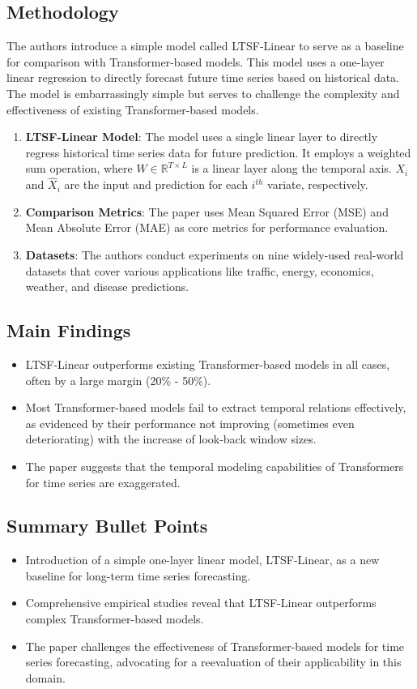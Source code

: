 \documentclass{article}
\begin{document}
\subsection{Methodology}
The authors introduce a simple model called LTSF-Linear to serve as a baseline for comparison with Transformer-based models. This model uses a one-layer linear regression to directly forecast future time series based on historical data. The model is embarrassingly simple but serves to challenge the complexity and effectiveness of existing Transformer-based models.

\begin{enumerate}
    \item \textbf{LTSF-Linear Model}: The model uses a single linear layer to directly regress historical time series data for future prediction. It employs a weighted sum operation, where \( W \in \mathbb{R}^{T \times L} \) is a linear layer along the temporal axis. \( X_i \) and \( \hat{X}_i \) are the input and prediction for each \( i^{th} \) variate, respectively.
    \item \textbf{Comparison Metrics}: The paper uses Mean Squared Error (MSE) and Mean Absolute Error (MAE) as core metrics for performance evaluation.
    \item \textbf{Datasets}: The authors conduct experiments on nine widely-used real-world datasets that cover various applications like traffic, energy, economics, weather, and disease predictions.
\end{enumerate}

\subsection{Main Findings}
\begin{itemize}
    \item LTSF-Linear outperforms existing Transformer-based models in all cases, often by a large margin (20\% - 50\%).
    \item Most Transformer-based models fail to extract temporal relations effectively, as evidenced by their performance not improving (sometimes even deteriorating) with the increase of look-back window sizes.
    \item The paper suggests that the temporal modeling capabilities of Transformers for time series are exaggerated.
\end{itemize}

\subsection{Summary Bullet Points}
\begin{itemize}
    \item Introduction of a simple one-layer linear model, LTSF-Linear, as a new baseline for long-term time series forecasting.
    \item Comprehensive empirical studies reveal that LTSF-Linear outperforms complex Transformer-based models.
    \item The paper challenges the effectiveness of Transformer-based models for time series forecasting, advocating for a reevaluation of their applicability in this domain.
\end{itemize}
\end{document}
